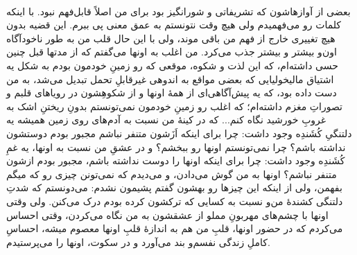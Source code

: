 \documentclass[12pt]{book}
\begin{document}
    \paragraph{}
    بعضی از آوازهاشون که تشریفاتی و شورانگیز بود برای من اصلاً قابل‌فهم نبود. با اینکه کلمات رو می‌فهمیدم ولی هیچ وقت نتونستم به عمق معنی پی ببرم. این قضیه بدون هیچ تغییری خارج از فهم من باقی موند، ولی با این حال قلب من به طور ناخودآگاه اون‌و بیشتر و بیشتر جذب می‌کرد. من اغلب به اونها می‌گفتم که از مدتها قبل چنین حسی داشته‌ام، که این لذت و شکوه، موقعی که رو زمینِ خودمون بودم به شکل یه اشتیاق مالیخولیایی که بعضی مواقع به اندوهی غیرقابلِ تحمل تبدیل می‌شد، به من دست داده بود، که یه پیش‌آگاهی‌ای از همهٔ اونها و از شکوهِشون در رویاهای قلبم و تصوراتِ مغزم داشته‌ام؛ که اغلب رو زمینِ خودمون نمی‌تونستم بدونِ ریختنِ اشک به غروبِ خورشید نگاه کنم... که در کینهٔ من نسبت به آدم‌های روی زمین همیشه یه دلتنگیِ کُشَندِه وجود داشت: چرا برای اینکه اَزَشون متنفر نباشم مجبور بودم دوستشون نداشته باشم؟  چرا نمی‌تونستم اونها رو ببخشم؟ و در عشقِ من نسبت به اونها، یه غمِ کُشَندِه وجود داشت: چرا برای اینکه اونها را دوست نداشته باشم، مجبور بودم ازشون متنفر نباشم؟ اونها به من گوش می‌دادن، و می‌دیدم که نمی‌تونن چیزی رو که میگم بفهمن، ولی از اینکه این چیزها رو بهشون گفتم پشیمون نشدم: می‌دونستم که شدتِ دلتنگی کشندهٔ من‌و نسبت به کسایی که ترکشون کرده بودم درک می‌کنن. ولی وقتی اونها با چشم‌های مهربونِ مملو از عشقشون به من نگاه می‌کردن، وقتی احساس می‌کردم که در حضور اونها، قلبِ من هم به اندازهٔ قلبِ اونها معصوم میشه، احساسِ کاملِ زندگی نفسم‌و بند می‌آورد و در سکوت، اونها را می‌پرستیدم.
\end{document}
